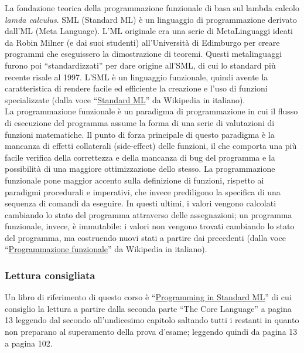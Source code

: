 \documentclass{article}
\begin{document}
La fondazione teorica della programmazione funzionale di basa sul lambda calcolo \emph{lamda calculus}.
SML (Standard ML) è un linguaggio di programmazione derivato dall'ML (Meta Language).
L'ML originale era una serie di MetaLinguaggi ideati da Robin Milner (e dai suoi studenti) all'Università di Edimburgo per creare programmi che eseguissero la dimostrazione di teoremi.
Questi metalinguaggi furono poi ``standardizzati'' per dare origine all'SML, di cui lo standard più recente risale al 1997.
L'SML è un linguaggio funzionale, quindi avente la caratteristica di rendere facile ed efficiente la creazione e l'uso di funzioni specializzate (dalla voce ``\href{https://it.wikipedia.org/wiki/Standard_ML}{Standard ML}'' da Wikipedia in italiano).\\[10pt]
La programmazione funzionale è un paradigma di programmazione in cui il flusso di esecuzione del programma assume la forma di una serie di valutazioni di funzioni matematiche. Il punto di forza principale di questo paradigma è la mancanza di effetti collaterali (side-effect) delle funzioni, il che comporta una più facile verifica della correttezza e della mancanza di bug del programma e la possibilità di una maggiore ottimizzazione dello stesso.
La programmazione funzionale pone maggior accento sulla definizione di funzioni, rispetto ai paradigmi procedurali e imperativi, che invece prediligono la specifica di una sequenza di comandi da eseguire. In questi ultimi, i valori vengono calcolati cambiando lo stato del programma attraverso delle assegnazioni; un programma funzionale, invece, è immutabile: i valori non vengono trovati cambiando lo stato del programma, ma costruendo nuovi stati a partire dai precedenti (dalla voce ``\href{https://it.wikipedia.org/wiki/Programmazione_funzionale}{Programmazione funzionale}'' da Wikipedia in italiano).

\subsubsection*{Lettura consigliata}

Un libro di riferimento di questo corso è ``\href{http://www.cs.cmu.edu/~rwh/isml/book.pdf}{Programming in Standard ML}'' di cui consiglio la lettura a partire dalla seconda parte ``The Core Language'' a pagina 13 leggendo dal secondo all'undicesimo capitolo
saltando tutti i restanti in quanto non preparano al superamento della prova d'esame; leggendo quindi da pagina 13 a pagina 102.
\end{document}
